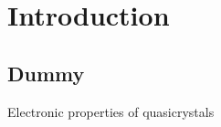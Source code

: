 \section{Introduction}
\subsection{Dummy}

\begin{frame}{Electronic properties of quasicrystals}

\end{frame}
